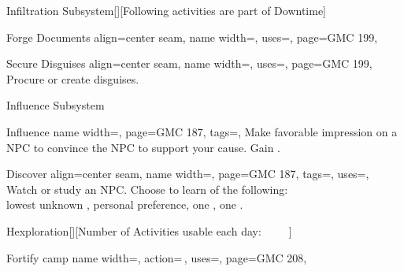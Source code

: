 \begin{PageFrontLandscape}
\begin{TablesHalf}{\frontTableHeight}
\begin{Table}{Infiltration Subsystem}[\;\dash\;][Following activities are part of Downtime]
\begin{entry}{Forge Documents}{%
                align=center seam,
                name width=\activityLength,%
                uses={\Society[tags=S]},
                page=GMC 199,
            }
            \end{entry}
            \begin{entry}{Secure Disguises}{%
                align=center seam,
                name width=\activityLength,%
                uses=,
                page=GMC 199,
            }
                Procure or create disguises. \\\phant
            \end{entry}
        \end{Table}
        \vfill
        \begin{Table}{Influence Subsystem}
            \begin{entry}{Influence}{%
                name width=\activityLength,%
                page=GMC 187,
                tags=\Concentrate\Linguistic,
            }
                Make favorable impression on a NPC to convince the NPC to support your cause.
                \hfill Gain  .
            \end{entry}
            \begin{entry}{Discover}{%
                align=center seam,
                name width=\activityLength,%
                page=GMC 187,
                tags=\Concentrate,
                uses={\Perception[tags=S]},
            }
                Watch or study an NPC.
                Choose to learn  of the following:  \hfill{}\\
                {lowest unknown  ,
                    \quad personal preference,
                    \quad one ,
                    \quad one .}
            \end{entry}
        \end{Table}
        \vfill
        \begin{Table}{Hexploration}[][Number of Activities usable each day:
        \quad\quad {}\,\Feet {}%
        \quad\quad {}\,\Feet {}%
        \quad\quad {}\,\Feet {}%
        \quad\quad {}\,\Feet {}%
        \quad\quad {}\,\Feet {}]
            \begin{entry}{Fortify camp}{%
                name width=\activityLength,%
                action=\,,
                uses=\Crafting,
                page=GMC 208,
            }

\end{entry}
\end{Table}
\end{TablesHalf}
\end{PageFrontLandscape}
